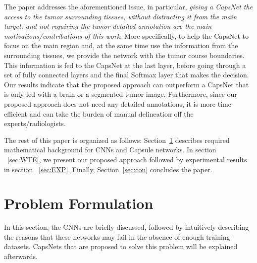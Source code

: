 \documentclass{article}
\begin{document}
The paper addresses the aforementioned issue, in particular, \textit{giving a CapsNet the access to the tumor surrounding tissues, without distracting it from the main target, and not requiring the tumor detailed annotation are the main motivations/contributions of this work}. More specifically, to help the CapsNet to focus on the main region and, at the same time use the information from the surrounding tissues, we provide the network with the tumor course boundaries. This information is fed to the CapsNet at the last layer, before going through a set of fully connected layers and the final Softmax layer that makes the decision. Our results indicate that the proposed approach can outperform a CapsNet that is only fed with a brain or a segmented tumor image. Furthermore, since our proposed approach does not need any detailed annotations, it is more time-efficient and can take the burden of manual delineation off the experts/radiologists.

The rest of this paper is organized as follows: Section~\ref{sec:framework} describes required mathematical background for CNNs and Capsule networks. In section ~\ref{sec:WTE}, we present our proposed approach followed by experimental results in section ~\ref{sec:EXP}. Finally, Section~\ref{sec:con} concludes the paper.
\section{Problem Formulation} \label{sec:framework}
In this section,  the CNNs are briefly discussed, followed by intuitively describing the reasons that these networks may fail in the absence of enough training datasets. CapsNets that are proposed to solve this problem will be explained afterwards.

\end{document}
